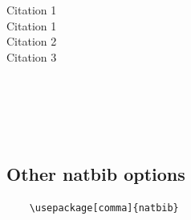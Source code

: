 \documentclass[12pts]{article}
\begin{document}
	
	Citation 1 \citep[see][]{dupas2013savings} \\
	Citation 1 \citep[see][p.~215]{dupas2013savings} \\
	
	Citation 2 \citep{alix2012forest} \\
	Citation 3 \citep*{alix2012forest}
	
	\citeauthor{de2008returns} \\
	\citeauthor*{de2008returns} \\
	\citeyear{de2008returns} \\ 
	\citeyearpar{de2008returns} \\ 
	
	
	\subsection{Other natbib options}

	\begin{verbatim}
	\usepackage[comma]{natbib}
	
	\end{verbatim}

	
	
\end{document}
